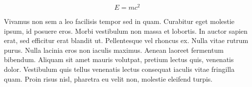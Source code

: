 \documentclass[10pt]{article}
\begin{document}
\begin{multicols}{2}
\begin{equation}
E = mc^2
\end{equation}

Vivamus non sem a leo facilisis tempor sed in quam. Curabitur eget molestie ipsum, id posuere eros. Morbi vestibulum non massa et lobortis. In auctor sapien erat, sed efficitur erat blandit ut. Pellentesque vel rhoncus ex. Nulla vitae rutrum purus. Nulla lacinia eros non iaculis maximus. Aenean laoreet fermentum bibendum. Aliquam sit amet mauris volutpat, pretium lectus quis, venenatis dolor. Vestibulum quis tellus venenatis lectus consequat iaculis vitae fringilla quam. Proin risus nisl, pharetra eu velit non, molestie eleifend turpis.

\end{multicols}
\end{document}
